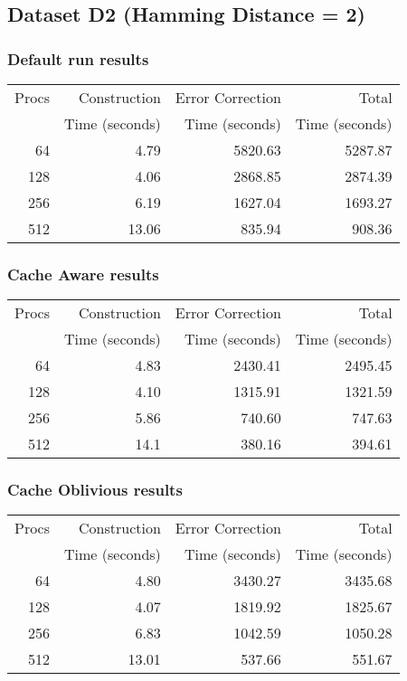 \documentclass[integrals, nointegrals, article, 12pt, a4paper]{article}
\begin{document}
\subsection{Dataset D2 (Hamming Distance = 2)}
\label{sec-2-2}
\subsubsection{Default run results}
\label{sec-2-2-1}

\begin{center}
\begin{tabular}{rrrr}
\hline
Procs & Construction & Error Correction & Total\\
 & Time (seconds) & Time (seconds) & Time (seconds)\\
\hline
64 & 4.79 & 5820.63 & 5287.87\\
128 & 4.06 & 2868.85 & 2874.39\\
256 & 6.19 & 1627.04 & 1693.27\\
512 & 13.06 & 835.94 & 908.36\\
\hline
\end{tabular}
\end{center}
\subsubsection{Cache Aware results}
\label{sec-2-2-2}

\begin{center}
\begin{tabular}{rrrr}
\hline
Procs & Construction & Error Correction & Total\\
 & Time (seconds) & Time (seconds) & Time (seconds)\\
\hline
64 & 4.83 & 2430.41 & 2495.45\\
128 & 4.10 & 1315.91 & 1321.59\\
256 & 5.86 & 740.60 & 747.63\\
512 & 14.1 & 380.16 & 394.61\\
\hline
\end{tabular}
\end{center}
\subsubsection{Cache Oblivious results}
\label{sec-2-2-3}

\begin{center}
\begin{tabular}{rrrr}
\hline
Procs & Construction & Error Correction & Total\\
 & Time (seconds) & Time (seconds) & Time (seconds)\\
\hline
64 & 4.80 & 3430.27 & 3435.68\\
128 & 4.07 & 1819.92 & 1825.67\\
256 & 6.83 & 1042.59 & 1050.28\\
512 & 13.01 & 537.66 & 551.67\\
\hline
\end{tabular}
\end{center}
\end{document}
